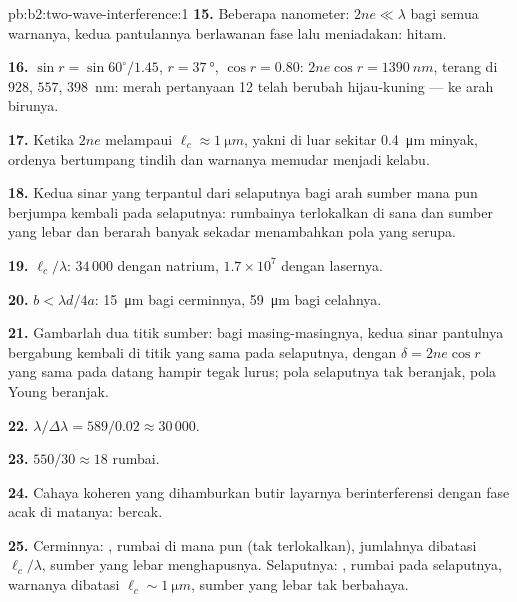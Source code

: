 \begin{solution}{pb:b2:two-wave-interference:1}
\textbf{15.} Beberapa nanometer: $2ne \ll \lambda$ bagi semua warnanya, kedua
pantulannya berlawanan fase lalu meniadakan: hitam.

\textbf{16.} $\sin r = \sin60^\circ/1.45$, $r = \qty{37}{\degree}$, $\cos r = 0.80$: $2ne\cos r
= \qty{1390}{nm}$, terang di $928$, $557$, \qty{398}{nm}: merah pertanyaan 12 telah
berubah hijau-kuning --- ke arah birunya.

\textbf{17.} Ketika $2ne$ melampaui $\ell_c \approx \qty{1}{\micro m}$, yakni di luar sekitar
\qty{0.4}{\micro m} minyak, ordenya bertumpang tindih dan warnanya memudar menjadi kelabu.

\textbf{18.} Kedua sinar yang terpantul dari selaputnya bagi arah sumber
mana pun berjumpa kembali pada selaputnya: rumbainya terlokalkan di sana dan
sumber yang lebar dan berarah banyak sekadar menambahkan pola yang serupa.

\textbf{19.} $\ell_c/\lambda$: $34\,000$ dengan natrium, $1.7 \times 10^7$ dengan lasernya.

\textbf{20.} $b < \lambda d/4a$: \qty{15}{\micro m} bagi cerminnya, \qty{59}{\micro m} bagi
celahnya.

\textbf{21.} Gambarlah dua titik sumber: bagi masing-masingnya, kedua sinar pantulnya
bergabung kembali di titik yang sama pada selaputnya, dengan $\delta = 2ne\cos r$ yang sama
pada datang hampir tegak lurus; pola selaputnya tak beranjak, pola Young
beranjak.

\textbf{22.} $\lambda/\Delta\lambda = 589/0.02 \approx 30\,000$.

\textbf{23.} $550/30 \approx 18$ rumbai.

\textbf{24.} Cahaya koheren yang dihamburkan butir layarnya berinterferensi
dengan fase acak di matanya: bercak.

\textbf{25.} Cerminnya: , rumbai di mana pun
(tak terlokalkan), jumlahnya dibatasi $\ell_c/\lambda$, sumber yang lebar menghapusnya.
Selaputnya: , rumbai pada selaputnya, warnanya
dibatasi $\ell_c \sim \qty{1}{\micro m}$, sumber yang lebar tak berbahaya.
\end{solution}
